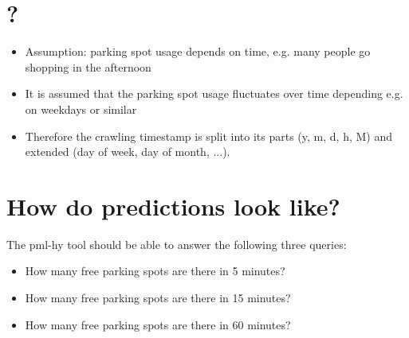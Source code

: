 \documentclass[journal,10pt]{IEEEtran}
\begin{document}
\section{?}

\begin{itemize}
 \item Assumption: parking spot usage depends on time, e.g. many people go shopping in the afternoon
 \item It is assumed that the parking spot usage fluctuates over time depending e.g. on weekdays or similar
 \item Therefore the crawling timestamp is split into its parts (y, m, d, h, M) and extended (day of week, day of month, ...).
\end{itemize}

\section{How do predictions look like?}

The pml-hy tool should be able to answer the following three queries:
\begin{itemize}
 \item How many free parking spots are there in 5 minutes?
 \item How many free parking spots are there in 15 minutes?
 \item How many free parking spots are there in 60 minutes?
\end{itemize}




\end{document}

